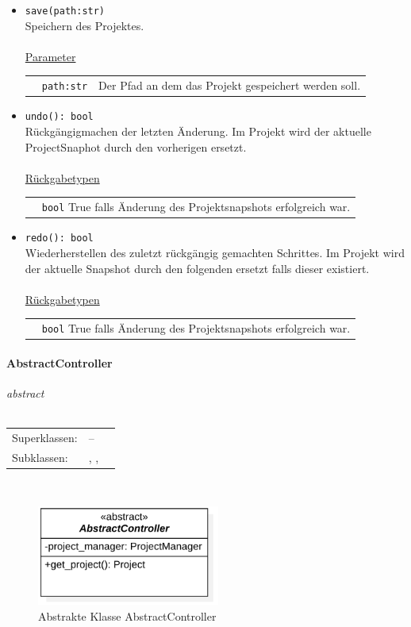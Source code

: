 \documentclass{article}
\newcommand{\classheader}[2][]{\paragraph{#2}
\mbox{}\textit{#1}\\\\}
\newcommand{\classref}[1]{\texttt{\nameref{cls:#1}}}
\begin{document}
\begin{itemize}
\item \texttt{save(path:str)}\\ Speichern des Projektes.\\\\
\underline{{Parameter}}\\
\begin{tabular}{lll}
 & \texttt{path:str} & Der Pfad an dem das Projekt gespeichert werden soll. \\
\end{tabular}
\item \texttt{undo(): bool}\\ Rückgängigmachen der letzten Änderung. Im Projekt wird der aktuelle ProjectSnaphot durch den vorherigen ersetzt.\\\\
\underline{{Rückgabetypen}}\\
\begin{tabular}{lp{10.7cm}}
 & \texttt{bool}  True falls Änderung des Projektsnapshots erfolgreich war.\\
\end{tabular}
\item \texttt{redo(): bool}\\ Wiederherstellen des zuletzt rückgängig gemachten Schrittes. Im Projekt wird der aktuelle Snapshot durch den folgenden ersetzt falls dieser existiert.\\\\
\underline{{Rückgabetypen}}\\
\begin{tabular}{lp{10.7cm}}
 & \texttt{bool}  True falls Änderung des Projektsnapshots erfolgreich war.\\
\end{tabular}
\end{itemize}


\newpage
\classheader[\flqq{}abstract\frqq]{AbstractController}\label{cls:AbstractController}
\begin{tabular}{lll}
 Superklassen: & -- \\
 Subklassen: & \classref{FunctionController}, \classref{EvaluationController}, \classref{ConfigurationController}
\end{tabular}\\
\begin{figure}[H]%
    \centering
    \includegraphics[width=6cm]{entwurf/Floriane/AbstractController.png}
    \caption{Abstrakte Klasse AbstractController}
\end{figure}
\end{document}
